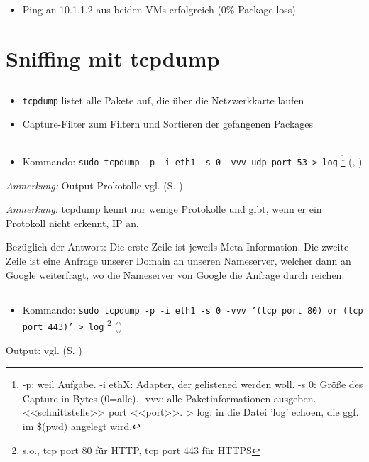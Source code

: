 \documentclass[twoside]{article}
\newcommand{\ttt}[1]{%
	\texttt{#1}%
}
\newcommand{\mref}[1]{\nameref{#1} (S. \pageref{#1})}
\begin{document}
\subsection{}
\begin{itemize}
	\item Ping an 10.1.1.2 aus beiden VMs erfolgreich (0\% Package loss)
\end{itemize}

\section{Sniffing mit tcpdump}
\subsection{}
\begin{itemize}
	\item \ttt{tcpdump} listet alle Pakete auf, die über die Netzwerkkarte laufen
	\item Capture-Filter zum Filtern und Sortieren der gefangenen Packages
\end{itemize}
\subsection{}
\begin{itemize}
	\item Kommando: \ttt{sudo tcpdump -p -i eth1 -s 0 -vvv udp port 53 > log}\footnote{-p: weil Aufgabe. -i ethX: Adapter, der gelistened werden woll. -s 0: Größe des Capture in Bytes (0=alle). -vvv: alle Paketinformationen ausgeben. <<schnittstelle>> port <<port>>. > log: in die Datei 'log' echoen, die ggf. im \$(pwd) angelegt wird.} (\cite{uwtcpdump}, \cite{daniel})
\end{itemize}
\textit{Anmerkung:} Output-Prokotolle vgl. \mref{sniffing}

\textit{Anmerkung:} tcpdump kennt nur wenige Protokolle und gibt, wenn er ein Protokoll nicht erkennt, IP an.

Bezüglich der Antwort:
Die erste Zeile ist jeweils Meta-Information.
Die zweite Zeile ist eine Anfrage unserer Domain an unseren Nameserver, welcher dann an Google weiterfragt, wo die Nameserver von Google die Anfrage durch reichen.
\subsection{}
\begin{itemize}
	\item Kommando: \ttt{sudo tcpdump -p -i eth1 -s 0 -vvv '(tcp port 80) or (tcp port 443)' > log}\footnote{s.o., tcp port 80 für HTTP, tcp port 443 für HTTPS} (\cite{uwtcpdump})
\end{itemize}
Output: vgl. \mref{http-https}
\end{document}
